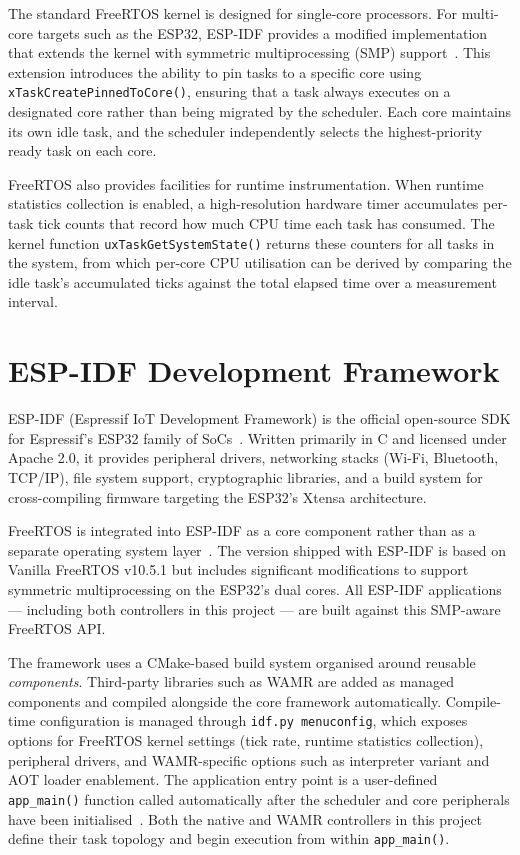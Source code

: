 \documentclass[12pt, a4paper]{report}
\begin{document}
The standard FreeRTOS kernel is designed for single-core processors. For multi-core targets
such as the ESP32, ESP-IDF provides a modified implementation that extends the kernel with
symmetric multiprocessing (SMP) support~\cite{freertos-esp}. This extension introduces the
ability to pin tasks to a specific core using
\texttt{xTaskCreatePinnedToCore()}, ensuring that a task always executes on a designated
core rather than being migrated by the scheduler. Each core maintains its own idle task, and
the scheduler independently selects the highest-priority ready task on each core.

FreeRTOS also provides facilities for runtime instrumentation. When runtime statistics
collection is enabled, a high-resolution hardware timer accumulates per-task tick counts that
record how much CPU time each task has consumed. The kernel function
\texttt{uxTaskGetSystemState()} returns these counters for all tasks in the system, from
which per-core CPU utilisation can be derived by comparing the idle task's accumulated ticks
against the total elapsed time over a measurement interval.

\section{ESP-IDF Development Framework}
\label{subsec:esp-idf}

ESP-IDF (Espressif IoT Development Framework) is the official open-source SDK for
Espressif's ESP32 family of SoCs~\cite{esp-idf-docs, esp-idf-github}. Written primarily in
C and licensed under Apache 2.0, it provides peripheral drivers, networking stacks (Wi-Fi,
Bluetooth, TCP/IP), file system support, cryptographic libraries, and a build system for
cross-compiling firmware targeting the ESP32's Xtensa architecture.

FreeRTOS is integrated into ESP-IDF as a core component rather than as a separate operating
system layer~\cite{freertos-esp}. The version shipped with ESP-IDF is based on Vanilla
FreeRTOS v10.5.1 but includes significant modifications to support symmetric multiprocessing
on the ESP32's dual cores. All ESP-IDF applications --- including both controllers in this
project --- are built against this SMP-aware FreeRTOS API.

The framework uses a CMake-based build system organised around reusable
\textit{components}. Third-party libraries such as WAMR are added as managed components and
compiled alongside the core framework automatically. Compile-time configuration is managed
through \texttt{idf.py menuconfig}, which exposes options for FreeRTOS kernel settings
(tick rate, runtime statistics collection), peripheral drivers, and WAMR-specific options
such as interpreter variant and AOT loader enablement. The application entry point is a
user-defined \texttt{app\_main()} function called automatically after the scheduler and core
peripherals have been initialised~\cite{freertos-esp}. Both the native and WAMR controllers
in this project define their task topology and begin execution from within
\texttt{app\_main()}.
\end{document}
